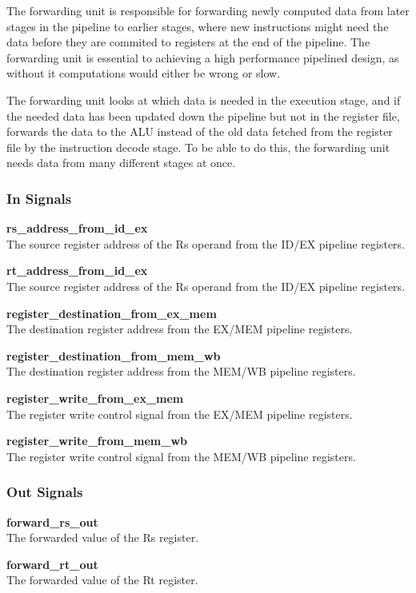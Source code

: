 The forwarding unit is responsible for forwarding newly computed data from later stages in the pipeline to earlier stages, where new instructions might need the data before they are commited to registers at the end of the pipeline.
The forwarding unit is essential to achieving a high performance pipelined design, as without it computations would either be wrong or slow.

The forwarding unit looks at which data is needed in the execution stage, and if the needed data has been updated down the pipeline but not in the register file, forwards the data to the ALU instead of the old data fetched from the register file by the instruction decode stage.
To be able to do this, the forwarding unit needs data from many different stages at once.

\subsubsection{In Signals}

\begin{description}
\item{\textbf{rs\_address\_from\_id\_ex}} \\
    The source register address of the Rs operand from the ID/EX pipeline registers.

\item{\textbf{rt\_address\_from\_id\_ex}} \\
    The source register address of the Rs operand from the ID/EX pipeline registers.

\item{\textbf{register\_destination\_from\_ex\_mem}} \\
    The destination register address from the EX/MEM pipeline registers.

\item{\textbf{register\_destination\_from\_mem\_wb}} \\
    The destination register address from the MEM/WB pipeline registers.

\item{\textbf{register\_write\_from\_ex\_mem}} \\
    The register write control signal from the EX/MEM pipeline registers.

\item{\textbf{register\_write\_from\_mem\_wb}} \\
    The register write control signal from the MEM/WB pipeline registers.
\end{description}

\subsubsection{Out Signals}

\begin{description}
\item{\textbf{forward\_rs\_out}} \\
    The forwarded value of the Rs register.

\item{\textbf{forward\_rt\_out}} \\
    The forwarded value of the Rt register.

\end{description}
